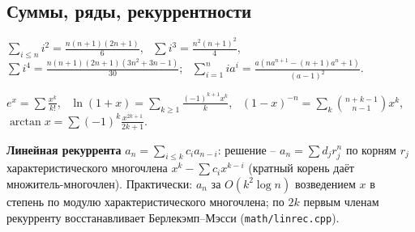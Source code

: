\subsection{Суммы, ряды, рекуррентности}
$\sum_{i\le n} i^2=\frac{n(n{+}1)(2n{+}1)}6$, \ $\sum i^3=\frac{n^2(n{+}1)^2}4$, \ $\sum i^4=\frac{n(n{+}1)(2n{+}1)(3n^2{+}3n{-}1)}{30}$; \ $\sum_{i=1}^nia^i=\frac{a(na^{n+1}-(n{+}1)a^n+1)}{(a-1)^2}$.
\par $e^x=\sum\frac{x^k}{k!}$, \ $\ln(1{+}x)=\sum_{k\ge1}\frac{(-1)^{k+1}x^k}k$, \ $(1{-}x)^{-n}=\sum_k\binom{n+k-1}{n-1}x^k$, \ $\arctan x=\sum(-1)^k\frac{x^{2k+1}}{2k+1}$.
\par \textbf{Линейная рекуррента} $a_n=\sum_{i\le k}c_ia_{n-i}$: решение -- $a_n=\sum d_jr_j^n$ по корням $r_j$ характеристического многочлена $x^k-\sum c_ix^{k-i}$ (кратный корень даёт множитель-многочлен). Практически: $a_n$ за $O(k^2\log n)$ возведением $x$ в степень по модулю характеристического многочлена; по $2k$ первым членам рекурренту восстанавливает Берлекэмп--Мэсси (\texttt{math/linrec.cpp}).

